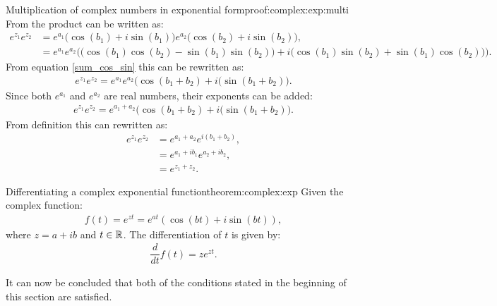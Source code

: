 \begin{prof}{Multiplication of complex numbers in exponential form}{proof:complex:exp:multi}
From  the product can be written as:
\begin{align*}
e^{z_1}e^{z_2}&=e^{a_1}\big(\cos(b_1)+i\sin(b_1)\big)e^{a_2}\big(\cos(b_2)+i\sin(b_2)\big),
\\
&=e^{a_1}e^{a_2} \Big( \big(\cos(b_1)\cos(b_2)-\sin(b_1) \sin(b_2) \big)+i \big(\cos(b_1)\sin(b_2)+\sin(b_1)\cos(b_2) \big) \Big).
\end{align*}
From equation \eqref{sum_cos_sin} this can be rewritten as:
\begin{align*}
e^{z_1}e^{z_2}=e^{a_1}e^{a_2}\big(\cos(b_1+b_2)+i(\sin(b_1+b_2)\big).
\end{align*}
Since both $e^{a_1}$ and $e^{a_2}$ are real numbers, their exponents can be added:
\begin{align*}
e^{z_1}e^{z_2}=e^{a_1+a_2}\big(\cos(b_1+b_2)+i(\sin(b_1+b_2)\big).
\end{align*}
From definition 
this can rewritten as:
\begin{align*}
e^{z_1}e^{z_2}&=e^{a_1+a_2}e^{i(b_1+b_2)},
\\
&=e^{a_1+ib_1}e^{a_2+ib_2},
\\
&=e^{z_1+z_2}.
\end{align*} 
\end{prof}

\begin{theorem}{Differentiating a complex exponential function}{theorem:complex:exp}
Given the complex function:
\begin{align*}
f(t)=e^{zt}=e^{at}(\cos(bt)+i\sin(bt)),
\end{align*}
where $z=a+ib$ and $t\in \mathbb{R}$. The differentiation of $t$ is given by:
\begin{align*}
\dfrac{d}{dt}f(t)=ze^{zt}.
\end{align*}
\end{theorem}



\noindent
It can now be concluded that both of the conditions stated in the beginning of this section are satisfied. 